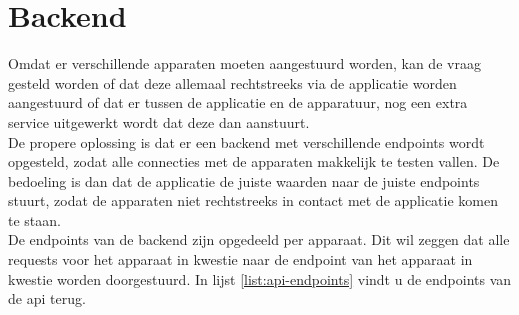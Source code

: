 \section{Backend}
\label{sec:stand-van-zaken-backend}

Omdat er verschillende apparaten moeten aangestuurd worden, kan de vraag gesteld worden of dat deze allemaal rechtstreeks via de applicatie worden aangestuurd of dat er tussen de applicatie en de apparatuur, nog een extra service uitgewerkt wordt dat deze dan aanstuurt.\\

De propere oplossing is dat er een backend met verschillende endpoints wordt opgesteld, zodat alle connecties met de apparaten makkelijk te testen vallen. De bedoeling is dan dat de applicatie de juiste waarden naar de juiste endpoints stuurt, zodat de apparaten niet rechtstreeks in contact met de applicatie komen te staan.\\

De endpoints van de backend zijn opgedeeld per apparaat. Dit wil zeggen dat alle requests voor het apparaat in kwestie naar de endpoint van het apparaat in kwestie worden doorgestuurd. In lijst \ref{list:api-endpoints} vindt u de endpoints van de api terug.

